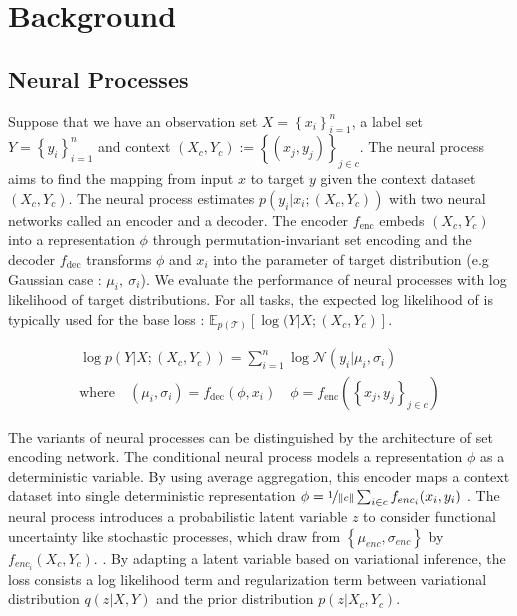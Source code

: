 \section{Background}

\subsection {Neural Processes}
Suppose that we have an observation set $X = \left\{x_i \right\}_{i=1}^{n}$, a
label set $Y = \left\{y_i\right\}_{i=1}^{n}$ and context $(X_c, Y_c) :=
\left\{(x_j, y_j)\right\}_{j\in c}$. The neural process aims to find the mapping
from input $x$ to target $y$ given the context dataset $(X_c, Y_c)$. The neural
process estimates $p(y_i|x_i;(X_c, Y_c))$ with two neural networks called an
encoder and a decoder. The encoder $f_{\textrm{enc}}$ embeds $(X_c, Y_c)$ into a
representation $\phi$ through permutation-invariant set encoding
\cite{zaheer2017deep, edwardstowards} and the decoder $f_{\textrm{dec}}$
transforms $\phi$ and $x_i$ into the parameter of target distribution (e.g
Gaussian case : $\mu_i, \ \sigma_i$). We evaluate the performance of neural
processes with log likelihood of target distributions. For all tasks, the
expected log likelihood of is typically used for the base loss :
$\mathbb{E}_{p(\mathcal{T})} [\log(Y|X;(X_c,Y_c)]$.

\begin{equation}
\label{eq1}
\begin{gathered}
\log p(Y | X; (X_c, Y_c)) = \sum_{i=1}^{n} \log \mathcal{N}(y_i|\mu_i,\sigma_i) \\
\textrm{where} \quad (\mu_i, \sigma_i) = f_{\textrm{dec}}(\phi, x_i) \quad \phi = f_{\textrm{enc}}(\left\{ x_j, y_j\right\}_{j \in c})
\end{gathered}
\end{equation}

The variants of neural processes can be distinguished by the architecture of set
encoding network. The conditional neural process models a representation $\phi$
as a deterministic variable. By using average aggregation, this encoder maps a
context dataset into single deterministic representation $\phi =
\nicefrac{1}{\lVert c \rVert} \sum_{i \in c} f_{enc_i}(x_i, y_i)$
\cite{garnelo2018conditional}. The neural process introduces a probabilistic
latent variable $z$ to consider functional uncertainty like stochastic
processes, which draw from $\left\{\mu_{enc}, \sigma_{enc}\right\}$ by
$f_{enc_i}(X_c, Y_c)$. \cite{garnelo2018neural}. By adapting a latent variable
based on variational inference, the loss consists a log likelihood term and
regularization term between variational distribution $q(z|X, Y)$ and the prior
distribution $p(z|X_c, Y_c)$. 

